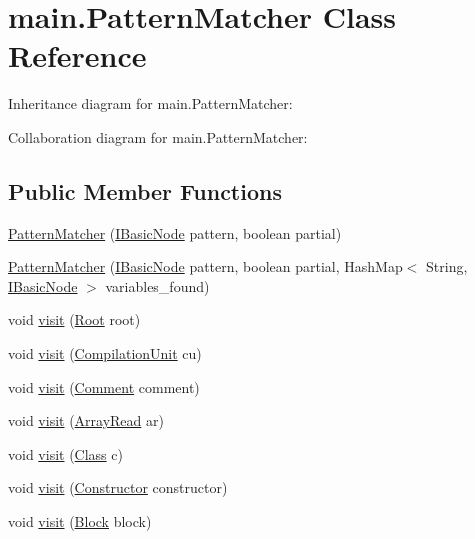 \hypertarget{classmain_1_1_pattern_matcher}{}\section{main.\+Pattern\+Matcher Class Reference}
\label{classmain_1_1_pattern_matcher}


Inheritance diagram for main.\+Pattern\+Matcher\+:


Collaboration diagram for main.\+Pattern\+Matcher\+:
\subsection*{Public Member Functions}
\begin{DoxyCompactItemize}
\item 
\hyperlink{classmain_1_1_pattern_matcher_afeba9aabc2f406397fc5fb11293d9b06}{Pattern\+Matcher} (\hyperlink{interfaceparser_1_1_i_basic_node}{I\+Basic\+Node} pattern, boolean partial)
\item 
\hyperlink{classmain_1_1_pattern_matcher_a2703e95874dcf73e5d5adb7b318a5863}{Pattern\+Matcher} (\hyperlink{interfaceparser_1_1_i_basic_node}{I\+Basic\+Node} pattern, boolean partial, Hash\+Map$<$ String, \hyperlink{interfaceparser_1_1_i_basic_node}{I\+Basic\+Node} $>$ variables\+\_\+found)
\item 
void \hyperlink{classmain_1_1_pattern_matcher_a6e6b3557c40aaf7526e21d81c44ce926}{visit} (\hyperlink{classparser_1_1_root}{Root} root)
\item 
void \hyperlink{classmain_1_1_pattern_matcher_ac2b90993fb0b87908640381da0c20395}{visit} (\hyperlink{classparser_1_1_compilation_unit}{Compilation\+Unit} cu)
\item 
void \hyperlink{classmain_1_1_pattern_matcher_a12a5c2a0000c7fc9d95cc4db9e3716a9}{visit} (\hyperlink{classparser_1_1_comment}{Comment} comment)
\item 
void \hyperlink{classmain_1_1_pattern_matcher_a81f7fa2c65a4f56fb7cb78ed31bf3188}{visit} (\hyperlink{classparser_1_1_array_read}{Array\+Read} ar)
\item 
void \hyperlink{classmain_1_1_pattern_matcher_a20854edce8be2fbe8c6b23bb4e29f7f5}{visit} (\hyperlink{classparser_1_1_class}{Class} c)
\item 
void \hyperlink{classmain_1_1_pattern_matcher_aa858db02b232c0742956f1ce658a368c}{visit} (\hyperlink{classparser_1_1_constructor}{Constructor} constructor)
\item 
void \hyperlink{classmain_1_1_pattern_matcher_ab212d6dee84c5aecb24cdc99efb8211e}{visit} (\hyperlink{classparser_1_1_block}{Block} block)

\end{DoxyCompactItemize}
